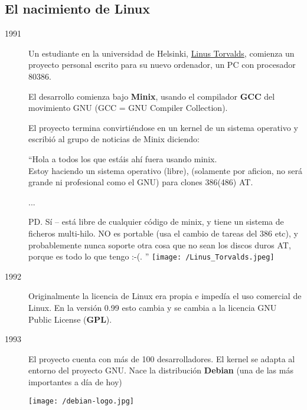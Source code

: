 \subsection{El nacimiento de Linux}
\begin{description}

\item[1991] Un estudiante en la universidad de Helsinki, \href{https://en.wikipedia.org/wiki/Linus_Torvalds}{Linus Torvalds}, comienza un proyecto personal escrito para su nuevo ordenador, un PC con procesador 80386.

El desarrollo comienza bajo \textbf{Minix}, usando el compilador \textbf{GCC} del movimiento GNU (GCC = GNU Compiler Collection).

El proyecto termina convirtiéndose en un kernel de un sistema operativo y escribió al grupo de noticias de Minix diciendo:

\begin{tcolorbox}[title=Email de Linus Torvalds presentando Linux,sidebyside,righthand width=0.30\linewidth]
  “Hola a todos los que estáis ahí fuera usando minix.\\


  Estoy haciendo un sistema operativo (libre), (solamente por aficion, no será grande ni profesional como el GNU) para clones 386(486) AT.

  ...

  PD. Sí – está libre de cualquier código de minix, y tiene un sistema de ficheros multi-hilo. NO es portable (usa el cambio de tareas del 386 etc), y probablemente nunca soporte otra cosa que no sean los discos duros AT, porque es todo lo que tengo :-(. ”
  \tcblower
  \texttt{[image: /Linus\_Torvalds.jpeg]}
  \vspace{-30pt}
\end{tcolorbox}


\item[1992] Originalmente la licencia de Linux era propia e impedía el uso comercial de Linux. En la versión 0.99 esto cambia y se cambia a la licencia GNU Public License (\textbf{GPL}).

\item[1993] El proyecto cuenta con más de 100 desarrolladores. El kernel se adapta al entorno del proyecto GNU. Nace la distribución \textbf{Debian} (una de las más importantes a día de hoy)

\begin{center}
  \texttt{[image: /debian-logo.jpg]}
  \vspace{-10pt}
\end{center}


\end{description}
